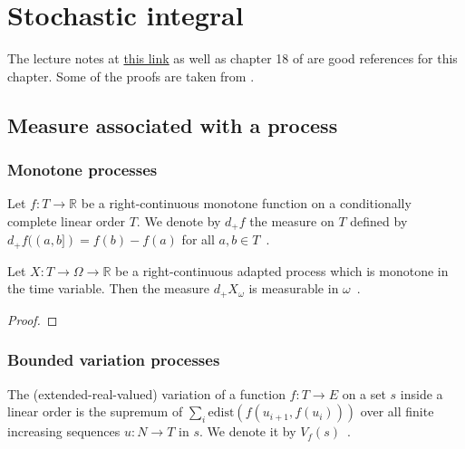 \chapter{Stochastic integral}

The lecture notes at \href{https://dec41.user.srcf.net/h/III_L/stochastic_calculus_and_applications/}{this link} as well as chapter 18 of \cite{kallenberg2021} are good references for this chapter.
Some of the proofs are taken from \cite{pascucci2024}.



\section{Measure associated with a process}

\subsection{Monotone processes}

\begin{definition}\label{def:StieltjesFunction.measure}
  \mathlibok
Let $f : T \to \mathbb{R}$ be a right-continuous monotone function on a conditionally complete linear order $T$.
We denote by $d_+ f$ the measure on $T$ defined by $d_+ f((a, b]) = f(b) - f(a)$ for all $a, b \in T$~.
\end{definition}


\begin{lemma}\label{lem:StieltjesFunction.measurable_measure}
Let $X : T \to \Omega \to \mathbb{R}$ be a right-continuous adapted process which is monotone in the time variable.
Then the measure $d_+ X_\omega$ is measurable in $\omega$~.
\end{lemma}

\begin{proof}

\end{proof}



\subsection{Bounded variation processes}


\begin{definition}\label{def:eVariationOn}
  \mathlibok
The (extended-real-valued) variation of a function $f : T \to E$ on a set $s$ inside a linear order is the supremum of $\sum_i \mathrm{edist}(f(u_{i+1}, f(u_i)))$ over all finite increasing sequences $u : N \to T$ in $s$.
We denote it by $V_f(s)$~.
\end{definition}


